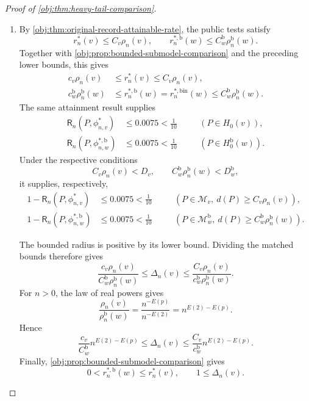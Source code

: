 \begin{proof}[Proof of \cref{obj:thm:heavy-tail-comparison}]
\begin{enumerate}
\item By \cref{obj:thm:original-record-attainable-rate}, the public tests satisfy
\[
r_n^*(v)\le C_v\rho_n(v),
\qquad
r_n^{*,\mathrm b}(w)\le C_w^{\mathrm b}\rho_n^{\mathrm b}(w).
\]
Together with \cref{obj:prop:bounded-submodel-comparison} and the preceding lower bounds, this gives
\[
\begin{aligned}
c_v\rho_n(v)
&\le r_n^*(v)\le C_v\rho_n(v),\\
c_w^{\mathrm b}\rho_n^{\mathrm b}(w)
&\le r_n^{*,\mathrm b}(w)
=r_n^{*,\mathrm{bin}}(w)
\le C_w^{\mathrm b}\rho_n^{\mathrm b}(w).
\end{aligned}
\]
The same attainment result supplies
\[
\begin{aligned}
\mathsf R_n(P,\phi^*_{n,v})&\le0.0075<\frac1{10}
&&\quad(P\in H_0(v)),\\
\mathsf R_n(P,\phi^{*,\mathrm b}_{n,w})&\le0.0075<\frac1{10}
&&\quad(P\in H_0^{\mathrm b}(w)).
\end{aligned}
\]
Under the respective conditions
\[
C_v\rho_n(v)<D_v,
\qquad
C_w^{\mathrm b}\rho_n^{\mathrm b}(w)<D_w^{\mathrm b},
\]
it supplies, respectively,
\[
\begin{aligned}
1-\mathsf R_n(P,\phi^*_{n,v})&\le0.0075<\frac1{10}
&&\quad(P\in\mathcal M_v,\ d(P)\ge C_v\rho_n(v)),\\
1-\mathsf R_n(P,\phi^{*,\mathrm b}_{n,w})&\le0.0075<\frac1{10}
&&\quad(P\in\mathcal M_w^{\mathrm b},\
d(P)\ge C_w^{\mathrm b}\rho_n^{\mathrm b}(w)).
\end{aligned}
\]

The bounded radius is positive by its lower bound. Dividing the matched bounds therefore gives
\[
\frac{c_v\rho_n(v)}
     {C_w^{\mathrm b}\rho_n^{\mathrm b}(w)}
\le\Delta_n(v)
\le
\frac{C_v\rho_n(v)}
     {c_w^{\mathrm b}\rho_n^{\mathrm b}(w)}.
\]
For \(n>0\), the law of real powers gives
\[
\frac{\rho_n(v)}{\rho_n^{\mathrm b}(w)}
=\frac{n^{-E(p)}}{n^{-E(2)}}
=n^{E(2)-E(p)}.
\]
Hence
\[
\frac{c_v}{C_w^{\mathrm b}}n^{E(2)-E(p)}
\le\Delta_n(v)
\le
\frac{C_v}{c_w^{\mathrm b}}n^{E(2)-E(p)}.
\]
Finally, \cref{obj:prop:bounded-submodel-comparison} gives
\[
0<r_n^{*,\mathrm b}(w)\le r_n^*(v),
\qquad
1\le\Delta_n(v).
\]


\end{enumerate}
\end{proof}
